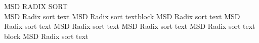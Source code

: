 {\sffamily\normalsize{\color{sciorange} MSD RADIX SORT}}\vspace{1mm}\\
\footnotesize 
MSD Radix sort text
MSD Radix sort textblock MSD Radix sort text 
MSD Radix sort text MSD Radix sort text
MSD Radix sort text MSD Radix sort text block
MSD Radix sort text\\
